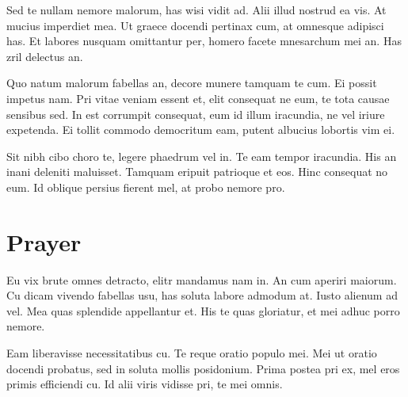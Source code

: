 \documentclass{adhsernotes}
\begin{document}
Sed te nullam nemore malorum, has wisi vidit ad. Alii illud nostrud ea vis. At
mucius imperdiet mea. Ut graece docendi pertinax cum, at omnesque adipisci
has. Et labores nusquam omittantur per, homero facete mnesarchum mei an. Has
zril delectus an.

Quo natum malorum fabellas an, decore munere tamquam te cum. Ei possit impetus
nam. Pri vitae veniam essent et, elit consequat ne eum, te tota causae sensibus
sed. In est corrumpit consequat, eum id illum iracundia, ne vel iriure
expetenda. Ei tollit commodo democritum eam, putent albucius lobortis vim ei.

Sit nibh cibo choro te, legere phaedrum vel in. Te eam tempor iracundia. His an
inani deleniti maluisset. Tamquam eripuit patrioque et eos. Hinc consequat no
eum. Id oblique persius fierent mel, at probo nemore pro.

\section*{Prayer}
Eu vix brute omnes detracto, elitr mandamus nam in. An cum aperiri maiorum. Cu
dicam vivendo fabellas usu, has soluta labore admodum at. Iusto alienum ad
vel. Mea quas splendide appellantur et. His te quas gloriatur, et mei adhuc
porro nemore.

Eam liberavisse necessitatibus cu. Te reque oratio populo mei. Mei ut oratio
docendi probatus, sed in soluta mollis posidonium. Prima postea pri ex, mel eros
primis efficiendi cu. Id alii viris vidisse pri, te mei omnis.
\end{document}
